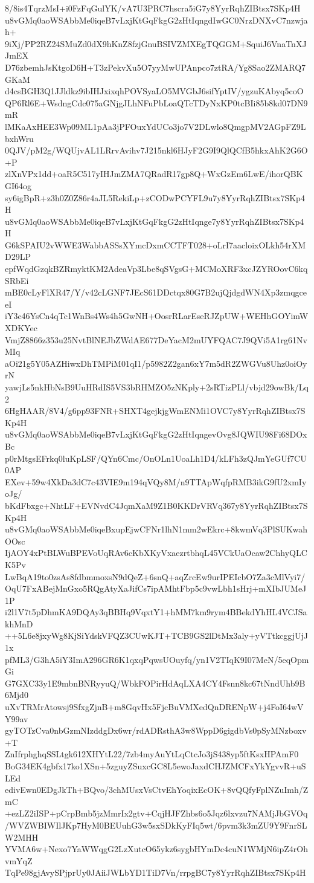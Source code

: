 8/8is4TqrzMsI+i0FzFqGulYK/vA7U3PRC7hscra5iG7y8YyrRqhZIBtsx7SKp4H
u8vGMq0aoWSAbbMe0iqeB7vLxjKtGqFkgG2zHtIqngdIwGC0NrzDNXvC7nzwjah+
9iXj/PP2RZ24SMuZd0dX9hKnZ8fzjGnuBSIVZMXEgTQGGM+SquiJ6VnaTnXJJmEX
D76zbemhJsKtgoD6H+T3zPekvXu5O7yyMwUPAnpco7ztRA/Yg8Sao2ZMARQ7GKaM
d4csBGH3Q1JJldkz9ibIHJxixqhPOVSyaLO5MVGbJ6sifYptIV/ygzuKAbyq5coO
QP6Rl6E+WsdngCdc075aGNjgJLhNFuPbLoaQTcTDyNxKP0tcBIi85b8kd07DN9mR
lMKaAxHEE3Wp09ML1pAa3jPFOuxYdUCo3jo7V2DLwlo8QmgpMV2AGpFZ9LbxhWru
0QJV/pM2g/WQUjvAL1LRrvAvihv7J215nkl6HJyF2G9I9QlQCfB5hkxAhK2G6O+P
zlXnVPx1dd+oaR5C517yIHJmZMA7QRadR17gp8Q+WxGzEm6LwE/ihorQBKGI64og
sy6igBpR+z3h0Z0Z86r4aJL5RekiLp+zCODwPCYFL9u7y8YyrRqhZIBtsx7SKp4H
u8vGMq0aoWSAbbMe0iqeB7vLxjKtGqFkgG2zHtIqnge7y8YyrRqhZIBtsx7SKp4H
G6kSPAIU2vWWE3WabbASSsXYmcDxmCCTFT028+oLrI7aacloixOLkh54rXMD29LP
epfWqdGzqkBZRmyktKM2AdeaVp3Lbe8qSVgsG+MCMoXRF3xcJZYROovC6kqSRbEi
mBE0cLyFlXR47/Y/v42cLGNF7JEcS61DDctqx80G7B2ujQjdgdWN4Xp3zmqgceeI
iY3c46YsCn4qTc1WnBs4Ws4h5GwNH+OosrRLarEseRJZpUW+WEHhGOYimWXDKYec
VmjZ8866z353u25NvtBlNEJbZWdAE677DeYacM2mUYFQAC7J9QVi5A1rg61NvMIq
aOi21g5Y05AZHiwxDhTMPiM01qI1/p5982Z2gan6xY7m5dR2ZWGVu8Uhz0oiOyrN
yawjLs5nkHbNsB9UuHRdIS5VS3bRHMZO5zNKply+2sRTizPLl/vbjd29owBk/Lq2
6HgHAAR/8V4/g6pp93FNR+SHXT4gejkjgWmENMi1OVC7y8YyrRqhZIBtsx7SKp4H
u8vGMq0aoWSAbbMe0iqeB7vLxjKtGqFkgG2zHtIqngevOvg8JQWIU98Fi68DOxBc
p0rMtgsEFrkq0luKpLSF/QYn6Cmc/OnOLn1UoaLh1D4/kLFh3zQJmYeGUf7CU0AP
EXev+59w4XkDa3dC7c43VIE9m194qVQy8M/n9TTApWqfpRMB3ikG9fU2xmIyoJg/
bKdFbxgc+NhtLF+EVNvdC4JqmXaM9Z1B0KKDrVRVq367y8YyrRqhZIBtsx7SKp4H
u8vGMq0aoWSAbbMe0iqeBxupEjwCFNr1lhN1mm2wEkrc+8kwmVq3PlSUKwahOOsc
IjAOY4xPtBLWuBPEVoUqRAv6cKbXKyVxaezrtbhqL45VCkUaOcaw2ChhyQLCK5Pv
LwBqA19to0zsAs8fdbmmoxsN9dQeZ+6snQ+aqZrcEw9urIPEIcbO7Za3cMlVyi7/
OqU7FxABejMnGxo5RQgAtyXaJifCs7ipAMhtFbp5c9vwLbh1sHrj+mXIbJUMeJ1P
i2l1V7t5pDhmKA9DQAy3qBBHq9VqxtY1+hMM7km9rym4BBekdYhHL4VCJSakhMnD
++5L6e8jxyWg8KjSiYdskVFQZ3CUwKJT+TCB9GS2lDtMx3aly+yVTtkcggjUjJ1x
pfML3/G3hA5iY3ImA296GR6K1qxqPqwsUOuyfq/yn1V2TIqK9I07MeN/5eqOpmGi
G7GXC33y1E9mbnBNRyyuQ/WbkFOPirHdAqLXA4CY4Fsnn8kc67tNndUhb9B6Mjd0
uXvTRMrAtowsj9SfxgZjnB+m8GqvHx5FjcBuVMXedQnDRENpW+j4FoI64wVY99av
gyTOTzCva0nbGzmNIzddgDx6wr/rdADRsthA3w8WppD6gigdbVs0pSyMNzboxv+T
ZnIfrphghqSSLtgk612XHYtL22/7zb4myAuYtLqCtcJo3jS438yp5ftKsxHPAmF0
BoG34EK4gbfx17ko1XSn+5zguyZSuxcGC8L5ewoJaxdCHJZMCFxYkYgvvR+uSLEd
edivEwn0EDgJkTh+BQvo/3chMUsxVsCtvEhYoqixEcOK+8vQQfyFplNZuImh/ZmC
+ezLZ2iISP+pCrpBmb5jzMmrIx2gtv+CqjHJFZhbs6o5Jqz6lxvzu7NAMjJbGVOq
/WVZWBIWIlJKp7HyM0BEUuhG3w5sxSDkKyFIq5wt/6pvm3k3mZU9Y9FnrSLW2MHH
YVMA6w+Nexo7YaWWqgG2LzXutcO65ykz6sygbHYmDc4cuN1WMjN6ipZ4rOhvmYqZ
TqPe98gjAvySPjprUy0JAiiJWLbYD1TiD7Vn/rrpgBC7y8YyrRqhZIBtsx7SKp4H
